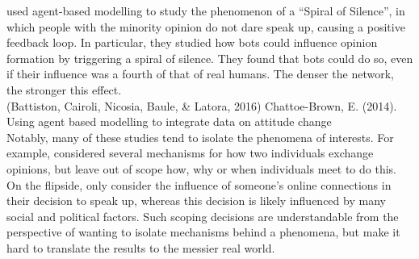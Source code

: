 \cite{Ross2019} used agent-based modelling to study the phenomenon of a “Spiral of Silence”, in which people with the minority opinion do not dare speak up, causing a positive feedback loop. In particular, they studied how bots could influence opinion formation by triggering a spiral of silence. They found that bots could do so, even if their influence was a fourth of that of real humans. The denser the network, the stronger this effect. \\

(Battiston, Cairoli, Nicosia, Baule, \& Latora, 2016)
Chattoe-Brown, E. (2014). Using agent based modelling to integrate data on attitude change \\

Notably, many of these studies tend to isolate the phenomena of interests. For example, \cite{Deffuant2002} considered several mechanisms for how two individuals exchange opinions, but leave out of scope how, why or when individuals meet to do this. On the flipside, \cite{Ross2019} only consider the influence of someone’s online connections in their decision to speak up, whereas this decision is likely influenced by many social and political factors. Such scoping decisions are understandable from the perspective of wanting to isolate mechanisms behind a phenomena, but make it hard to translate the results to the messier real world.
